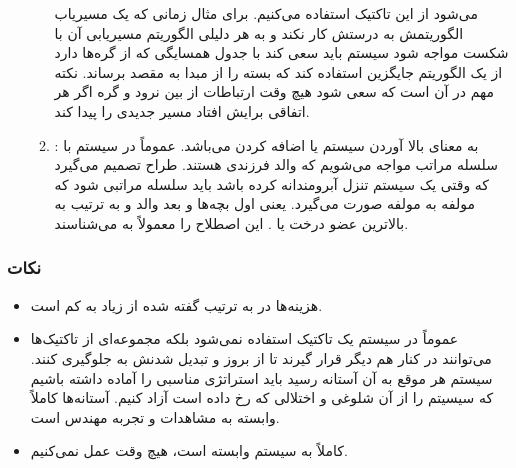 \begin{enumerate}
\begin{enumerate}
        می‌شود از این تاکتیک استفاده می‌کنیم. برای مثال زمانی که یک مسیریاب
        الگوریتمش به درستش کار نکند و به هر دلیلی الگوریتم مسیریابی آن با شکست
        مواجه شود سیستم باید سعی کند با جدول همسایگی که از گره‌ها دارد از یک
        الگوریتم جایگزین استفاده کند که بسته را از مبدا به مقصد برساند. نکته مهم
        در  آن است که سعی شود هیچ وقت ارتباطات از بین نرود و گره اگر هر
        اتفاقی برایش افتاد مسیر جدیدی را پیدا کند.
        \item {}: به معنای بالا آوردن سیستم یا اضافه کردن
        می‌باشد. عموماً در سیستم با سلسله مراتب مواجه می‌شویم که والد فرزندی
        هستند. طراح تصمیم می‌گیرد که وقتی یک سیستم تنزل آبرومندانه کرده باشد
        باید سلسله مراتبی  شود که مولفه به مولفه صورت می‌گیرد.
        یعنی اول بچه‌ها و بعد والد و به ترتیب به بالاترین عضو درخت یا .
        این اصطلاح را معمولاً به  می‌شناسند.
    \end{enumerate}
\end{enumerate}

\subsubsection*{نکات}

\begin{itemize}
    \item هزینه‌ها در  به ترتیب گفته شده از زیاد به کم است.
    \item عموماً در سیستم یک تاکتیک استفاده نمی‌شود بلکه مجموعه‌ای از تاکتیک‌ها
    می‌توانند در کنار هم دیگر قرار گیرند تا از بروز  و تبدیل شدنش به
     جلوگیری کنند. سیستم هر موقع به آن آستانه رسید باید استراتژی
    مناسبی را آماده داشته باشیم که سیسیتم را از آن شلوغی و اختلالی که رخ داده
    است آزاد کنیم. آستانه‌ها کاملاً وابسته به مشاهدات و تجربه مهندس است.
    \item کاملاً به سیستم وابسته است، هیچ وقت  عمل نمی‌کنیم.
\end{itemize}

\subsubsection{}

